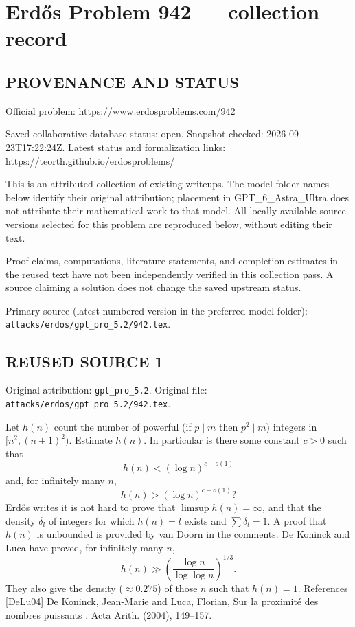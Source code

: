 \section*{Erd\H{o}s Problem 942 --- collection record}

\subsection*{PROVENANCE AND STATUS}
Official problem: https://www.erdosproblems.com/942

Saved collaborative-database status: open.
Snapshot checked: 2026-09-23T17:22:24Z.
Latest status and formalization links: https://teorth.github.io/erdosproblems/

This is an attributed collection of existing writeups. The model-folder names below identify their original attribution; placement in GPT\_6\_Astra\_Ultra does not attribute their mathematical work to that model. All locally available source versions selected for this problem are reproduced below, without editing their text.

Proof claims, computations, literature statements, and completion estimates in the reused text have not been independently verified in this collection pass. A source claiming a solution does not change the saved upstream status.

Primary source (latest numbered version in the preferred model folder): \texttt{attacks/erdos/gpt\_pro\_5.2/942.tex}.

\subsection*{REUSED SOURCE 1}
Original attribution: \texttt{gpt\_pro\_5.2}.
Original file: \texttt{attacks/erdos/gpt\_pro\_5.2/942.tex}.


Let $h(n)$ count the number of powerful (if $p\mid m$ then $p^2\mid m$) integers in $[n^2,(n+1)^2)$. Estimate $h(n)$. In particular is there some constant $c>0$ such that\[h(n) < (\log n)^{c+o(1)}\]and, for infinitely many $n$,\[h(n) >(\log n)^{c-o(1)}?\] Erd\H{o}s writes it is not hard to prove that $\limsup h(n)=\infty$, and that the density $\delta_l$ of integers for which $h(n)=l$ exists and $\sum \delta_l=1$. A proof that $h(n)$ is unbounded is provided by van Doorn in the comments. De Koninck and Luca \cite{DeLu04} have proved, for infinitely many $n$,\[h(n) \gg \left(\frac{\log n}{\log\log n}\right)^{1/3}.\]They also give the density ($\approx 0.275$) of those $n$ such that $h(n)=1$. References [DeLu04] De Koninck, Jean-Marie and Luca, Florian, Sur la proximit\'{e} des nombres puissants . Acta Arith. (2004), 149--157.

